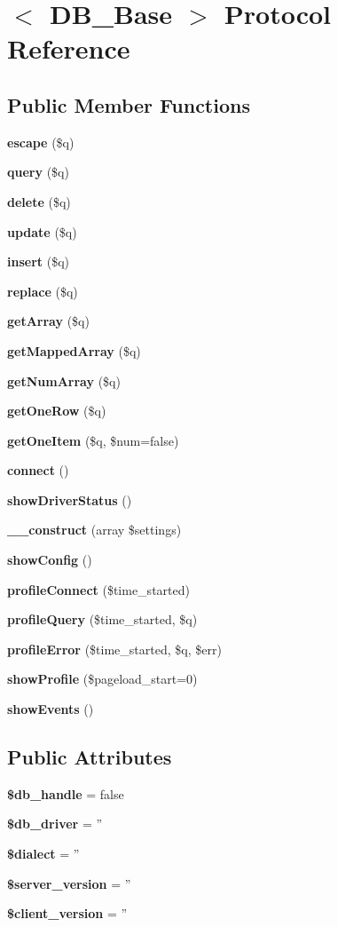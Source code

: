 \section{$<$ DB\_\-Base $>$ Protocol Reference}
\label{protocolDB__Base-p}
\subsection*{Public Member Functions}
\begin{CompactItemize}
\item 
{\bf escape} (\$q)
\item 
{\bf query} (\$q)
\item 
{\bf delete} (\$q)
\item 
{\bf update} (\$q)
\item 
{\bf insert} (\$q)
\item 
{\bf replace} (\$q)
\item 
{\bf getArray} (\$q)
\item 
{\bf getMappedArray} (\$q)
\item 
{\bf getNumArray} (\$q)
\item 
{\bf getOneRow} (\$q)
\item 
{\bf getOneItem} (\$q, \$num=false)
\item 
{\bf connect} ()
\item 
{\bf showDriverStatus} ()
\item 
{\bf \_\-\_\-construct} (array \$settings)
\item 
{\bf showConfig} ()
\item 
{\bf profileConnect} (\$time\_\-started)
\item 
{\bf profileQuery} (\$time\_\-started, \$q)
\item 
{\bf profileError} (\$time\_\-started, \$q, \$err)
\item 
{\bf showProfile} (\$pageload\_\-start=0)
\item 
{\bf showEvents} ()
\end{CompactItemize}
\subsection*{Public Attributes}
\begin{CompactItemize}
\item 
{\bf \$db\_\-handle} = false\label{protocolDB__Base-p_253c88caa7a38684b27c44bc4064c821}

\item 
{\bf \$db\_\-driver} = ''\label{protocolDB__Base-p_f7cc552d9e41abfef82b5d6688935714}

\item 
{\bf \$dialect} = ''\label{protocolDB__Base-p_0d5c7b175028440e1466586cf03cb11d}

\item 
{\bf \$server\_\-version} = ''\label{protocolDB__Base-p_a99a3f6d41364064b57f67ee40b97fd1}

\item 
{\bf \$client\_\-version} = ''\label{protocolDB__Base-p_4c7cf42dbff62065c5b5acc6d8e0bdb7}

\end{CompactItemize}
